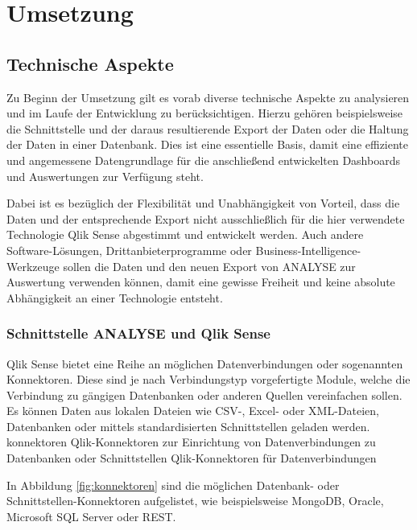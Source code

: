 \chapter{Umsetzung} %
\label{kap:umsetzung}
\minitoc\pagebreak

\section{Technische Aspekte}
\label{sec:tech}
Zu Beginn der Umsetzung gilt es vorab diverse technische Aspekte zu analysieren und im Laufe der Entwicklung zu berücksichtigen.
Hierzu gehören beispielsweise die Schnittstelle und der daraus resultierende Export der Daten oder die Haltung der Daten in einer Datenbank.
Dies ist eine essentielle Basis, damit eine effiziente und angemessene Datengrundlage für die anschließend entwickelten Dashboards und Auswertungen zur Verfügung steht.

Dabei ist es bezüglich der Flexibilität und Unabhängigkeit von Vorteil, dass die Daten und der entsprechende Export nicht ausschließlich für die hier verwendete Technologie Qlik Sense abgestimmt und entwickelt werden.
Auch andere Software-Lösungen, Drittanbieterprogramme oder Business-Intelligence-Werkzeuge sollen die Daten und den neuen Export von \gls{ANALYSE} zur Auswertung verwenden können, damit eine gewisse Freiheit und keine absolute Abhängigkeit an einer Technologie entsteht.

\subsection{Schnittstelle \acrlong*{ANALYSE} und Qlik Sense} %
\label{sub:schnittstelle}
Qlik Sense bietet eine Reihe an möglichen Datenverbindungen oder sogenannten \glqq Konnektoren\grqq.
Diese sind je nach Verbindungstyp vorgefertigte Module, welche die Verbindung zu gängigen Datenbanken oder anderen Quellen vereinfachen sollen.
Es können Daten aus lokalen Dateien wie CSV-, Excel- oder XML-Dateien, Datenbanken oder mittels standardisierten Schnittstellen geladen werden.
\bildbreit
{konnektoren}
{Qlik-Konnektoren zur Einrichtung von Datenverbindungen zu Datenbanken oder Schnittstellen}
{Qlik-Konnektoren für Datenverbindungen }

In Abbildung \ref{fig:konnektoren} sind die möglichen Datenbank- oder Schnittstellen-Konnektoren aufgelistet, wie beispielsweise \glqq MongoDB\grqq, \glqq Oracle\grqq, \glqq Microsoft SQL Server\grqq{} oder \glqq REST\grqq.

